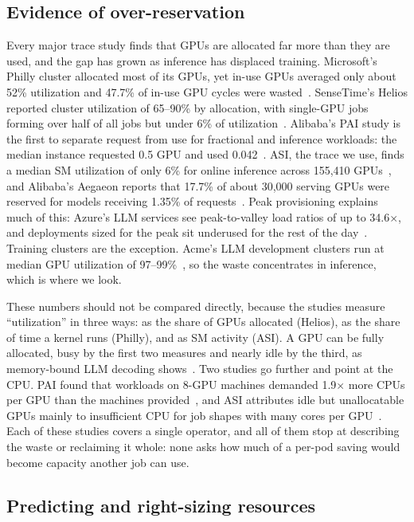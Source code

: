 \documentclass[10pt]{article}
\begin{document}
\subsection{Evidence of over-reservation}
\label{sec:rw-char}

Every major trace study finds that GPUs are allocated far more than they are used, and the gap has grown as inference has displaced training. Microsoft's Philly cluster allocated most of its GPUs, yet in-use GPUs averaged only about 52\% utilization and 47.7\% of in-use GPU cycles were wasted~\citep{jeon2019philly}. SenseTime's Helios reported cluster utilization of 65--90\% by allocation, with single-GPU jobs forming over half of all jobs but under 6\% of utilization~\citep{hu2021helios}. Alibaba's PAI study is the first to separate request from use for fractional and inference workloads: the median instance requested 0.5 GPU and used 0.042~\citep{weng2022mlaas}. ASI, the trace we use, finds a median SM utilization of only 6\% for online inference across 155{,}410 GPUs~\citep{li2026asi}, and Alibaba's Aegaeon reports that 17.7\% of about 30{,}000 serving GPUs were reserved for models receiving 1.35\% of requests~\citep{xiang2025aegaeon}. Peak provisioning explains much of this: Azure's LLM services see peak-to-valley load ratios of up to 34.6$\times$, and deployments sized for the peak sit underused for the rest of the day~\citep{stojkovic2025dynamollm}. Training clusters are the exception. Acme's LLM development clusters run at median GPU utilization of 97--99\%~\citep{hu2024acme}, so the waste concentrates in inference, which is where we look.

These numbers should not be compared directly, because the studies measure ``utilization'' in three ways: as the share of GPUs allocated (Helios), as the share of time a kernel runs (Philly), and as SM activity (ASI). A GPU can be fully allocated, busy by the first two measures and nearly idle by the third, as memory-bound LLM decoding shows~\citep{patel2024splitwise}. Two studies go further and point at the CPU. PAI found that workloads on 8-GPU machines demanded 1.9$\times$ more CPUs per GPU than the machines provided~\citep{weng2022mlaas}, and ASI attributes idle but unallocatable GPUs mainly to insufficient CPU for job shapes with many cores per GPU~\citep{li2026asi}. Each of these studies covers a single operator, and all of them stop at describing the waste or reclaiming it whole: none asks how much of a per-pod saving would become capacity another job can use.

\subsection{Predicting and right-sizing resources}
\label{sec:rw-pred}
\end{document}
